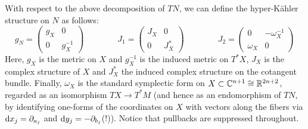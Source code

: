 \documentclass[parskip=half]{scrartcl}
\begin{document}
With respect to the above decomposition of $TN$, we can define the hyper-K\"ahler structure on $N$ as follows:
\begin{equation*}
	g_N=
	\begin{pmatrix}
		g_X & 0 \\ 0 & g_X^{-1}
	\end{pmatrix}
	\qquad \qquad 
	J_1=
	\begin{pmatrix}
		J_X & 0 \\ 0 & J_X^*
	\end{pmatrix}
	\qquad \qquad 
	J_2=
	\begin{pmatrix}
		0 & -\omega_X^{-1} \\ \omega_X & 0
	\end{pmatrix}
\end{equation*}
Here, $g_X$ is the metric on $X$ and $g^{-1}_X$ is the induced metric on $T^*X$, $J_X$ is the complex structure of $X$ and $J^*_X$ the induced complex structure on the cotangent bundle. Finally, $\omega_X$ is the standard symplectic form on $X\subset \mathbb{C}^{n+1}\cong \mathbb{R}^{2n+2}$, regarded as an isomorphism $TX\to T^*M$ (and hence as an endomorphism of $TN$, by identifying one-forms of the coordinates on $X$ with vectors along the fibers via $\mathrm{d} x_j=\partial_{a_j}$ and $\mathrm{d} y_j=-\partial_{b_j}$(!)). Notice that pullbacks are suppressed throughout.
\end{document}
